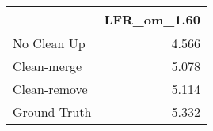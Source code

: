\begin{tabular}{lr}
\toprule
{} & LFR_om_1.60 \\
\midrule
No Clean Up  &       4.566 \\
Clean-merge  &       5.078 \\
Clean-remove &       5.114 \\
Ground Truth &       5.332 \\
\bottomrule
\end{tabular}
